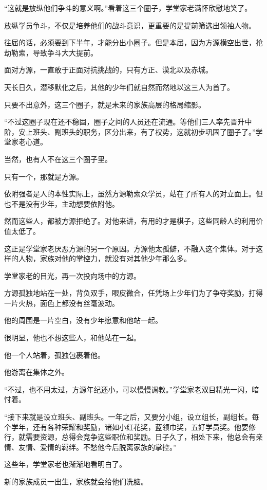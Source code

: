 \begin{this_body}
“这就是放纵他们争斗的意义啊。”看着这三个圈子，学堂家老满怀欣慰地笑了。

放纵学员争斗，不仅是培养他们的战斗意识，更重要的是提前筛选出领袖人物。

往届的话，必须要到下半年，才能分出小圈子。但是本届，因为方源横空出世，抢劫勒索，导致争斗大大提前。

面对方源，一直敢于正面对抗挑战的，只有方正、漠北以及赤城。

天长日久，潜移默化之后，其他的少年们就自然而然地以这三人为首了。

只要不出意外，这三个圈子，就是未来的家族高层的格局缩影。

“不过这圈子现在还不稳固，圈子之间的人员还在流通。等他们三人率先晋升中阶，安上班头、副班头的职务，区分出来，有了权势，这就初步巩固了圈子了。”学堂家老心道。

当然，也有人不在这三个圈子里。

只有一个，那就是方源。

依附强者是人的本性实际上，虽然方源勒索众学员，站在了所有人的对立面上。但也不是没有少年，主动想要依附他。

然而这些人，都被方源拒绝了。对他来讲，有用的才是棋子，这些同龄人的利用价值太低了。

这正是学堂家老厌恶方源的另一个原因。方源他太孤僻，不融入这个集体。对于这样的人物，家族对他的掌控力，就没有对其他少年那么多。

学堂家老的目光，再一次投向场中的方源。

方源孤独地站在一处，背负双手，眼皮微合，任凭场上少年们为了争夺奖励，打得一片火热，面色上都没有丝毫波动。

他的周围是一片空白，没有少年愿意和他站一起。

很明显，他也不想这些人，和他站在一起。

他一个人站着，孤独包裹着他。

他游离在集体之外。

“不过，也不用太过，方源年纪还小，可以慢慢调教。”学堂家老双目精光一闪，暗忖着。

“接下来就是设立班头、副班头。一年之后，又要分小组，设立组长，副组长。每个学年，还有各种荣耀和奖励，诸如小红花奖，蓝领巾奖，五好学员奖。他要修行，就需要资源，总得会竞争这些职位和奖励。日子久了，相处下来，他总会有亲情、友情、爱情的羁绊。不愁他今后脱离家族的掌控。”

这些年，学堂家老也渐渐地看明白了。

新的家族成员一出生，家族就会给他们洗脑。


\end{this_body}
